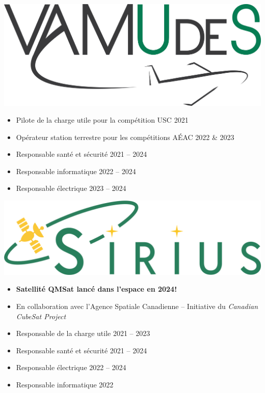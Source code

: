 \documentclass[10pt,a4paper,withhyper]{altacv}
\begin{document}
\newpage
{}

\hfill\begin{minipage}{2.5cm}
    \includegraphics[width=\linewidth]{figures/vamudes.pdf}
\end{minipage}
\vspace{-1cm}

\begin{itemize}
\item Pilote de la charge utile pour la compétition USC 2021
\item Opérateur station terrestre pour les compétitions AÉAC 2022 \& 2023
\item Responsable santé et sécurité 2021 -- 2024
\item Responsable informatique 2022 -- 2024
\item Responsable électrique 2023 -- 2024
\end{itemize}

\divider

\hfill\begin{minipage}{2.5cm}
    \includegraphics[width=\linewidth]{figures/sirius}
\end{minipage}
\vspace{-0.75cm}

\begin{itemize}
\item \textbf{Satellité QMSat lancé dans l'espace en 2024!}
\item En collaboration avec l'Agence Spatiale Canadienne -- Initiative du \textit{Canadian CubeSat Project}
\item Responsable de la charge utile 2021 -- 2023
\item Responsable santé et sécurité 2021 -- 2024
\item Responsable électrique 2022 -- 2024
\item Responsable informatique 2022
\end{itemize}
\end{document}
